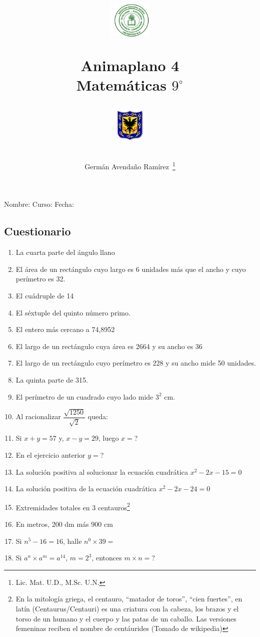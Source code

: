 \documentclass[letterpaper,11pt,twoside]{article}
\author{Germ\'an Avenda\~no Ram\'irez~\thanks{Lic. Mat. U.D., M.Sc. U.N.}}
\title{\begin{minipage}{.2\textwidth}
\includegraphics[height=1.75cm]{Images/logo-colegio.png}\end{minipage}
\begin{minipage}{.55\textwidth}
\begin{center}
Animaplano 4\\
Matemáticas $9^{\circ}$
\end{center}
\end{minipage}\hfill
\begin{minipage}{.2\textwidth}
\includegraphics[height=1.75cm]{Images/logo-sed.png} 
\end{minipage}}
\date{}
\begin{document}
\maketitle
Nombre: \hrulefill Curso: \underline{\hspace*{44pt}} Fecha: \underline{\hspace*{2.5cm}}
\begin{multicols}{2}
\section*{Cuestionario}
\begin{enumerate}
\item La cuarta parte del ángulo llano
\item El área de un rectángulo cuyo largo es 6 unidades más que el ancho y cuyo perímetro es 32.
\item El cuádruple de 14
\item El séxtuple del quinto número primo.
\item El entero más cercano a 74,8952
\item El largo de un rectángulo cuya área es 2664 y su ancho es 36
\item El largo de un rectángulo cuyo perímetro es 228 y su ancho mide 50 unidades.
\item La quinta parte de 315.
\item El perímetro de un cuadrado cuyo lado mide $3^{2}$ cm.
\item Al racionalizar $\dfrac{\sqrt{1250}}{\sqrt{2}}$ queda:
\item Si $x+y=57$ y, $x-y=29$, luego $x=$?
\item En el ejercicio anterior $y=$?
\item La solución positiva al solucionar la ecuación cuadrática $x^{2}-2x-15=0$
\item La solución positiva de la ecuación cuadrática $x^{2}-2x-24=0$
\item Extremidades totales en 3 centauros\footnote{En la mitología griega, el centauro, ``matador de toros'', ``cien fuertes'', en latín (Centaurus/Centauri) es una criatura con la cabeza, los brazos y el torso de un humano y el cuerpo y las patas de un caballo. Las versiones femeninas reciben el nombre de centáurides (Tomado de wikipedia)}
\item En metros, 200 dm más 900 cm
\item Si $n^{5}-16=16$, halle $n^{0}\times 39=$
\item Si $a^{n}\times a^{m}=a^{14}$, $m=2^{3}$, entonces $m\times n=$?

\end{enumerate}
\end{multicols}
\end{document}
